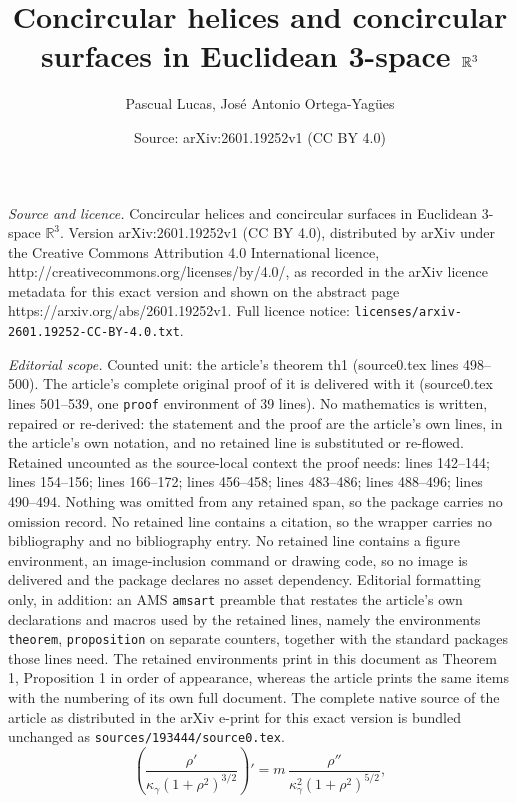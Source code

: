\documentclass[10pt,a4paper]{amsart}
\title{Concircular helices and concircular surfaces in Euclidean 3-space $\R3$}
\author{Pascual Lucas, Jos\'e Antonio Ortega-Yag\"ues}
\date{Source: arXiv:2601.19252v1 (CC BY 4.0)}
\def\R#1{\ensuremath{\mathbb{R}^{#1}}}
\begin{document}
\maketitle

\noindent\emph{Source and licence.} Concircular helices and concircular surfaces in Euclidean 3-space $\R3$. Version arXiv:2601.19252v1 (CC BY 4.0), distributed by arXiv under the Creative Commons Attribution 4.0 International licence, http://creativecommons.org/licenses/by/4.0/, as recorded in the arXiv licence metadata for this exact version and shown on the abstract page https://arxiv.org/abs/2601.19252v1. Full licence notice: \texttt{licenses/arxiv-2601.19252-CC-BY-4.0.txt}.\par\smallskip

\noindent\textit{Editorial scope.} Counted unit: the article's theorem th1 (source0.tex lines 498--500). The article's complete original proof of it is delivered with it (source0.tex lines 501--539, one \texttt{proof} environment of 39 lines). No mathematics is written, repaired or re-derived: the statement and the proof are the article's own lines, in the article's own notation, and no retained line is substituted or re-flowed.  Retained uncounted as the source-local context the proof needs: lines 142--144; lines 154--156; lines 166--172; lines 456--458; lines 483--486; lines 488--496; lines 490--494.  Nothing was omitted from any retained span, so the package carries no omission record.  No retained line contains a citation, so the wrapper carries no bibliography and no bibliography entry.  No retained line contains a figure environment, an image-inclusion command or drawing code, so no image is delivered and the package declares no asset dependency.  Editorial formatting only, in addition: an AMS \texttt{amsart} preamble that restates the article's own declarations and macros used by the retained lines, namely the environments \texttt{theorem}, \texttt{proposition} on separate counters, together with the standard packages those lines need.  The retained environments print in this document as Theorem 1, Proposition 1 in order of appearance, whereas the article prints the same items with the numbering of its own full document.  The complete native source of the article as distributed in the arXiv e-print for this exact version is bundled unchanged as \texttt{sources/193444/source0.tex}.
\begin{equation}\label{conc4}
\left(\frac{\rho'}{\kappa_\gamma(1+\rho^2)^{3/2}}\right)'= m\,\frac{\rho''}{\kappa_\gamma^2(1+\rho^2)^{5/2}},
\end{equation}
\end{document}
